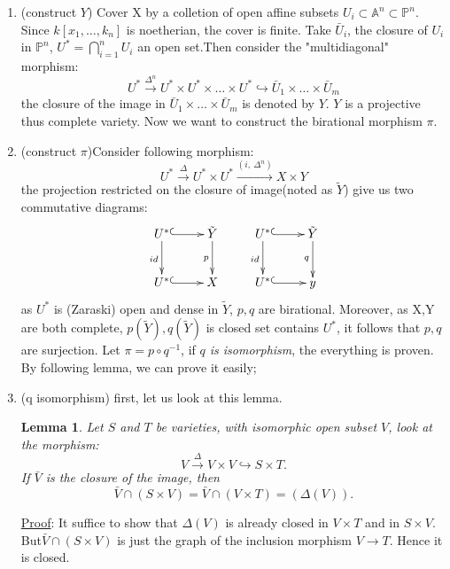 \documentclass[a4paper]{article}
\newtheorem{lemma}[thm]{Lemma}
\theoremstyle{definition}
\theoremstyle{remark}
\begin{document}
 \begin{enumerate}[itemindent=41pt,leftmargin=4pt,itemsep=0pt,parsep=0.2pt,label=$\bold{\qquad STEP \ \arabic{enumi}}$]
 \item(construct $Y$) Cover X by a colletion of open affine subsets $U_i\subset\mathbb{A}^n\subset\mathbb{P}^n$. Since $k[x_1,\dots,k_n]$ is noetherian, the cover is finite. Take $\bar{U}_i$, the closure of $U_i$ in $\mathbb{P}^n$, $U^* = \bigcap_{i=1}^nU_i$ an open set.Then consider the "multidiagonal" morphism: $$U^* \xrightarrow{\Delta^n} U^*\times U^* \times \dots \times U^*\hookrightarrow \bar{U}_1\times \dots \times\bar{U}_m $$ the closure of the image in $\bar{U}_1\times \dots \times\bar{U}_m$ is denoted by $Y$. $Y$ is a projective thus complete variety. Now we want to construct the birational morphism $\pi$.
 \item(construct $\pi$)Consider following morphism: $$U^* \xrightarrow{\Delta} U^*\times U^* \xrightarrow{(i ,\ \Delta^n)} X\times Y$$ the projection restricted on the closure of image(noted as $\tilde{Y}$) give us two commutative diagrams:
        \begin{displaymath} \xymatrix{
        U^* \ar@{^{(}->}[r]  \ar[d]_{id} &\tilde{Y} \ar[d]_{p}        &U^* \ar@{^{(}->}[r]  \ar[d]_{id} &\tilde{Y} \ar[d]_{q} \\
        U^* \ar@{^{(}->}[r]              &X                           &U^* \ar@{^{(}->}[r]              &y}
       \end{displaymath}
       as $U^*$ is (Zaraski) open and dense in ${\tilde{Y}}$, $p,q$ are birational. Moreover, as X,Y are both complete, $p({\tilde{Y}}),q(\tilde{Y})$ is closed set contains $U^*$, it follows that $p,q$ are surjection. Let $\pi=p\circ q^{-1}$, if \emph{$q$ is isomorphism}, the everything is proven. By following lemma, we can prove it easily;\\
 \item(q isomorphism) first, let us look at this lemma.
       \begin{lemma} Let $S$ and $T$ be varieties, with isomorphic open subset $V$, look at the morphism:\[V\xrightarrow{\Delta}V\times V\hookrightarrow S\times T.\] If $\bar{V}$ is the closure of the image, then\[\bar{V} \cap (S\times V)=\bar{V} \cap(V\times T)=(\Delta(V)).\]
       \end{lemma}
       \noindent\underline{Proof}: It suffice to show that $\Delta(V)$ is already closed in $V\times T$ and in $S\times V$. But$\bar{V} \cap (S\times V)$ is just the graph of the inclusion morphism $V\rightarrow T$. Hence it is closed.\\

\end{enumerate}
\end{document}
